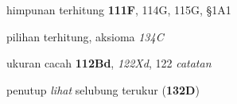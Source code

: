 himpunan terhitung {\bf 111F}, 114G, 115G, \S1A1







pilihan terhitung, aksioma {\it 134C}























































ukuran cacah {\bf 112Bd}, {\it 122Xd}, 122 {\it catatan}








penutup {\it lihat} selubung terukur ({\bf 132D})




































